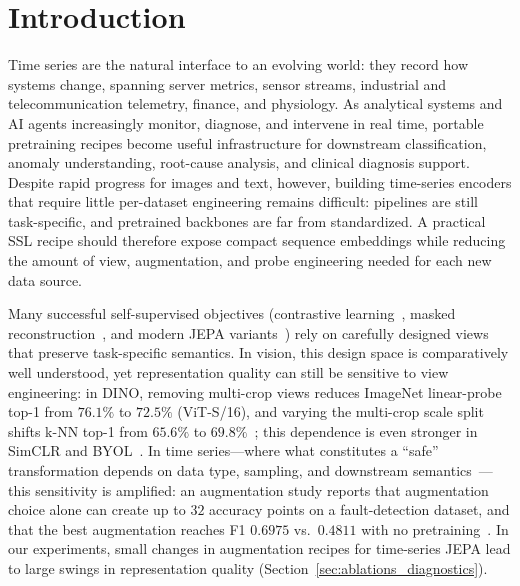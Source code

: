 \documentclass[sigconf,anonymous,review]{acmart}
\begin{document}
\maketitle

\section{Introduction}
\label{sec:introduction}

Time series are the natural interface to an evolving world: they record how systems change, spanning server metrics, sensor streams, industrial and telecommunication telemetry, finance, and physiology. As analytical systems and AI agents increasingly monitor, diagnose, and intervene in real time, portable pretraining recipes become useful infrastructure for downstream classification, anomaly understanding, root-cause analysis, and clinical diagnosis support. Despite rapid progress for images and text, however, building time-series encoders that require little per-dataset engineering remains difficult: pipelines are still task-specific, and pretrained backbones are far from standardized. A practical SSL recipe should therefore expose compact sequence embeddings while reducing the amount of view, augmentation, and probe engineering needed for each new data source.

Many successful self-supervised objectives (contrastive learning~\citep{chen2020simclr,he2020moco}, masked reconstruction~\citep{he2021mae}, and modern JEPA variants~\citep{assran2023ijepa,bardes2024vjepa,balestriero2025lejepa}) rely on carefully designed views that preserve task-specific semantics. In vision, this design space is comparatively well understood, yet representation quality can still be sensitive to view engineering: in DINO, removing multi-crop views reduces ImageNet linear-probe top-1 from $76.1\%$ to $72.5\%$ (ViT-S/16), and varying the multi-crop scale split shifts k-NN top-1 from $65.6\%$ to $69.8\%$~\citep{caron2021dino}; this dependence is even stronger in SimCLR and BYOL~\citep{chen2020simclr,grill2020byol}. In time series---where what constitutes a ``safe'' transformation depends on data type, sampling, and downstream semantics~\citep{yue2022ts2vec,eldele2021tstcc,woo2022cost,tonekaboni2021tnc}---this sensitivity is amplified: an augmentation study reports that augmentation choice alone can create up to $32$ accuracy points on a fault-detection dataset, and that the best augmentation reaches F1 $0.6975$ vs.\ $0.4811$ with no pretraining~\citep{liu2024tsaugselect}. In our experiments, small changes in augmentation recipes for time-series JEPA lead to large swings in representation quality (Section~\ref{sec:ablations_diagnostics}).
\end{document}
